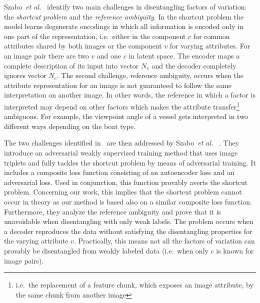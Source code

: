 \documentclass[a4paper,12pt]{report}
\begin{document}
Szabo~\textit{et al.}~\cite{ChallengInDisentIFoF} identify two main challenges in disentangling factors of variation: the \textit{shortcut problem} and the \textit{reference ambiguity}. In the shortcut problem the model learns degenerate encodings in which all information is encoded only in one part of the representation, i.e.\ either in the component $c$ for common attributes shared by both images or the component $v$ for varying attributes. For an image pair there are two $v$ and one $c$ in latent space. The encoder maps a complete description of its input into vector $N_v$ and the decoder completely ignores vector $N_c$.
The second challenge, reference ambiguity, occurs when the attribute representation for an image is not guaranteed to follow the same interpretation on another image. In other words, the reference in which a factor is interpreted may depend on other factors which makes the attribute transfer\footnote{i.e.\ the replacement of a feature chunk, which exposes an image attribute, by the same chunk from another image} ambiguous. For example, the viewpoint angle of a vessel gets interpreted in two different ways depending on the boat type.
\par The two challenges identified in~\cite{ChallengInDisentIFoF} are then addressed by Szabo~\textit{et al.}~ \cite{UnderstDegenAndAmbInAT}. They introduce an adversarial weakly supervised training method that uses image triplets and fully tackles the shortcut problem by means of adversarial training. It includes a composite loss function consisting of an autoencoder loss and an adversarial loss. Used in conjunction, this function provably averts the shortcut problem. Concerning our work, this implies that the shortcut problem cannot occur in theory as our method is based also on a similar composite loss function. Furthermore, they analyze the reference ambiguity and prove that it is unavoidable when disentangling with only weak labels. The problem occurs when a decoder reproduces the data without satisfying the disentangling properties for the varying attribute $v$. Practically, this means not all the factors of variation can provably be disentangled from weakly labeled data (i.e.\ when only $c$ is known for image pairs).    
\end{document}
